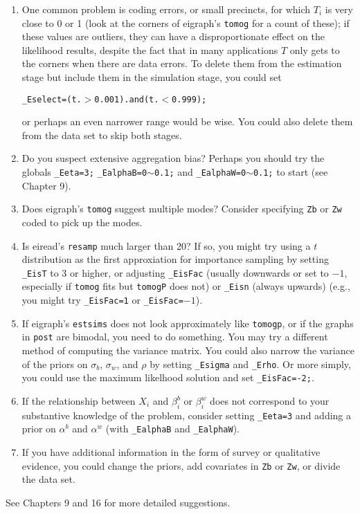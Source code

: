 \documentclass[11pt,titlepage]{article}
\begin{document}
\begin{enumerate}
\item One common problem is coding errors, or small precincts, for
  which $T_i$ is very close to 0 or 1 (look at the corners of
  eigraph's \texttt{tomog} for a count of these); if these values are
  outliers, they can have a disproportionate effect on the likelihood
  results, despite the fact that in many applications $T$ only gets to
  the corners when there are data errors.  To delete them from the
  estimation stage but include them in the simulation stage, you could
  set
  \begin{center}
    \texttt{\_Eselect=(t.$>$0.001).and(t.$<$0.999);}
  \end{center}
  or perhaps an even narrower range would be wise.  You could also
  delete them from the data set to skip both stages.

\item Do you suspect extensive aggregation bias?  Perhaps you should
  try the globals \texttt{\_Eeta=3;} \texttt{\_EalphaB=0$\sim$0.1;}
  and \texttt{\_EalphaW=0$\sim$0.1;} to start (see Chapter 9).

\item Does eigraph's \texttt{tomog} suggest multiple modes?  Consider
  specifying \texttt{Zb} or \texttt{Zw} coded to pick up the modes.

\item Is eiread's \texttt{resamp} much larger than 20?  If so, you
  might try using a $t$ distribution as the first approxiation for
  importance sampling by setting \texttt{\_EisT} to 3 or higher, or
  adjusting \texttt{\_EisFac} (usually downwards or set to $-1$,
  especially if \texttt{tomog} fits but \texttt{tomogP} does not) or
  \texttt{\_Eisn} (always upwards) (e.g., you might try
  \texttt{\_EisFac=1} or \texttt{\_EisFac=$-1$}).
  
\item If eigraph's \texttt{estsims} does not look approximately like
  \texttt{tomogp}, or if the graphs in \texttt{post} are bimodal, you
  need to do something.  You may try a different method of computing
  the variance matrix.  You could also narrow the variance of the
  priors on $\sigma_b$, $\sigma_w$, and $\rho$ by setting
  \texttt{\_Esigma} and \texttt{\_Erho}.  Or more simply, you could
  use the maximum likelhood solution and set \texttt{\_EisFac=-2;}.

\item If the relationship between $X_i$ and $\beta_i^b$ or $\beta_i^w$
  does not correspond to your substantive knowledge of the problem,
  consider setting \texttt{\_Eeta=3} and adding a prior on $\alpha^b$
  and $\alpha^w$ (with \texttt{\_EalphaB} and \texttt{\_EalphaW}).

\item If you have additional information in the form of survey or
  qualitative evidence, you could change the priors, add covariates in
  \texttt{Zb} or \texttt{Zw}, or divide the data set.
\end{enumerate}
See Chapters 9 and 16 for more detailed suggestions.
\end{document}
